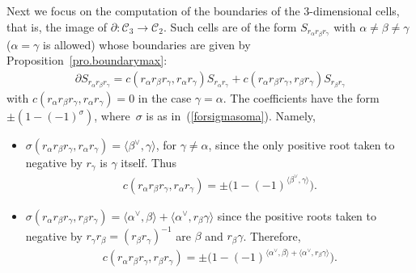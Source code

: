 \documentclass[10pt,a4paper]{amsart}
\numberwithin{equation}{section}
\begin{document}
Next we focus on the computation of the boundaries of the $3$-dimensional cells, that is, the image of $\partial\colon \mathcal{C}_{3}\longrightarrow \mathcal{C}_{2}$. Such cells are of the form $S_{r_{\alpha }r_{\beta
}r_{\gamma }}$ with $\alpha \neq \beta \neq \gamma $ ($\alpha =\gamma $ is allowed) whose boundaries are given by Proposition~\ref{pro.boundarymax}:
\begin{gather*}
\partial S_{r_{\alpha }r_{\beta }r_{\gamma }}=c ( r_{\alpha }r_{\beta}r_{\gamma },r_{\alpha }r_{\gamma } ) S_{r_{\alpha }r_{\gamma}}+c ( r_{\alpha }r_{\beta }r_{\gamma },r_{\beta }r_{\gamma } )S_{r_{\beta }r_{\gamma }}
\end{gather*}
with $c ( r_{\alpha }r_{\beta }r_{\gamma },r_{\alpha }r_{\gamma } ) =0$ in the case $\gamma =\alpha $. The coefficients have the form $\pm ( 1-(-1) ^{\sigma } ) $, where~$\sigma $ is as in~(\ref{forsigmasoma}). Namely,
\begin{itemize}\itemsep=0pt
\item $\sigma ( r_{\alpha }r_{\beta }r_{\gamma },r_{\alpha }r_{\gamma} ) =\langle \beta ^{\vee },\gamma \rangle $, for $\gamma \neq \alpha $, since the only positive root taken to negative by $r_{\gamma }$ is $\gamma
$ itself. Thus
\begin{gather}
c ( r_{\alpha }r_{\beta }r_{\gamma },r_{\alpha }r_{\gamma } ) =\pm \big( 1-(-1) ^{\langle \beta ^{\vee },\gamma \rangle }\big).\label{eq.cabcac}
\end{gather}
\item $\sigma ( r_{\alpha }r_{\beta }r_{\gamma },r_{\beta }r_{\gamma} ) =\langle \alpha ^{\vee },\beta \rangle +\langle \alpha ^{\vee},r_{\beta }\gamma \rangle $ since the positive roots taken to negative by $r_{\gamma }r_{\beta }= ( r_{\beta }r_{\gamma } ) ^{-1}$ are $\beta $ and $r_{\beta }\gamma $. Therefore,
\begin{gather} \label{eq.cabcbc}
c ( r_{\alpha }r_{\beta }r_{\gamma },r_{\beta }r_{\gamma } ) =\pm \big( 1-(-1) ^{\langle \alpha ^{\vee },\beta \rangle +\langle \alpha ^{\vee },r_{\beta }\gamma \rangle }\big).
\end{gather}
\end{itemize}
\end{document}
